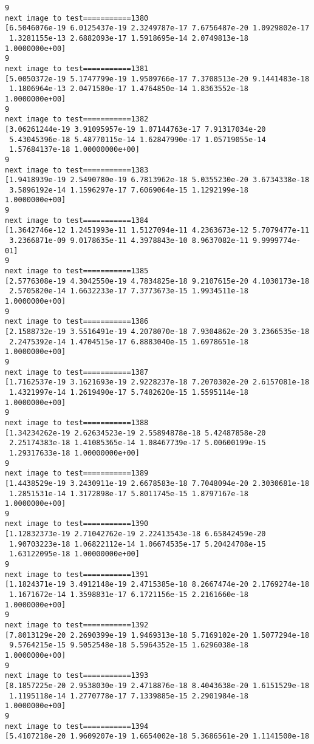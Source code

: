 \documentclass[11pt]{article}
\begin{document}
\begin{Verbatim}[commandchars=\\\{\}]
9
next image to test===========1380
[6.5046076e-19 6.0125437e-19 2.3249787e-17 7.6756487e-20 1.0929802e-17
 1.3281155e-13 2.6882093e-17 1.5918695e-14 2.0749813e-18 1.0000000e+00]
9
next image to test===========1381
[5.0050372e-19 5.1747799e-19 1.9509766e-17 7.3708513e-20 9.1441483e-18
 1.1806964e-13 2.0471580e-17 1.4764850e-14 1.8363552e-18 1.0000000e+00]
9
next image to test===========1382
[3.06261244e-19 3.91095957e-19 1.07144763e-17 7.91317034e-20
 5.43045396e-18 5.48770115e-14 1.62847990e-17 1.05719055e-14
 1.57684137e-18 1.00000000e+00]
9
next image to test===========1383
[1.9418939e-19 2.5490780e-19 6.7813962e-18 5.0355230e-20 3.6734338e-18
 3.5896192e-14 1.1596297e-17 7.6069064e-15 1.1292199e-18 1.0000000e+00]
9
next image to test===========1384
[1.3642746e-12 1.2451993e-11 1.5127094e-11 4.2363673e-12 5.7079477e-11
 3.2366871e-09 9.0178635e-11 4.3978843e-10 8.9637082e-11 9.9999774e-01]
9
next image to test===========1385
[2.5776308e-19 4.3042550e-19 4.7834825e-18 9.2107615e-20 4.1030173e-18
 2.5705820e-14 1.6632233e-17 7.3773673e-15 1.9934511e-18 1.0000000e+00]
9
next image to test===========1386
[2.1588732e-19 3.5516491e-19 4.2078070e-18 7.9304862e-20 3.2366535e-18
 2.2475392e-14 1.4704515e-17 6.8883040e-15 1.6978651e-18 1.0000000e+00]
9
next image to test===========1387
[1.7162537e-19 3.1621693e-19 2.9228237e-18 7.2070302e-20 2.6157081e-18
 1.4321997e-14 1.2619490e-17 5.7482620e-15 1.5595114e-18 1.0000000e+00]
9
next image to test===========1388
[1.34234262e-19 2.62634523e-19 2.55894878e-18 5.42487858e-20
 2.25174383e-18 1.41085365e-14 1.08467739e-17 5.00600199e-15
 1.29317633e-18 1.00000000e+00]
9
next image to test===========1389
[1.4438529e-19 3.2430911e-19 2.6678583e-18 7.7048094e-20 2.3030681e-18
 1.2851531e-14 1.3172898e-17 5.8011745e-15 1.8797167e-18 1.0000000e+00]
9
next image to test===========1390
[1.12832373e-19 2.71042762e-19 2.22413543e-18 6.65842459e-20
 1.90703223e-18 1.06822112e-14 1.06674535e-17 5.20424708e-15
 1.63122095e-18 1.00000000e+00]
9
next image to test===========1391
[1.1824371e-19 3.4912148e-19 2.4715385e-18 8.2667474e-20 2.1769274e-18
 1.1671672e-14 1.3598831e-17 6.1721156e-15 2.2161660e-18 1.0000000e+00]
9
next image to test===========1392
[7.8013129e-20 2.2690399e-19 1.9469313e-18 5.7169102e-20 1.5077294e-18
 9.5764215e-15 9.5052548e-18 5.5964352e-15 1.6296038e-18 1.0000000e+00]
9
next image to test===========1393
[8.1857225e-20 2.9538030e-19 2.4718876e-18 8.4043638e-20 1.6151529e-18
 1.1195118e-14 1.2770778e-17 7.1339885e-15 2.2901984e-18 1.0000000e+00]
9
next image to test===========1394
[5.4107218e-20 1.9609207e-19 1.6654002e-18 5.3686561e-20 1.1141500e-18

\end{Verbatim}
\end{document}
